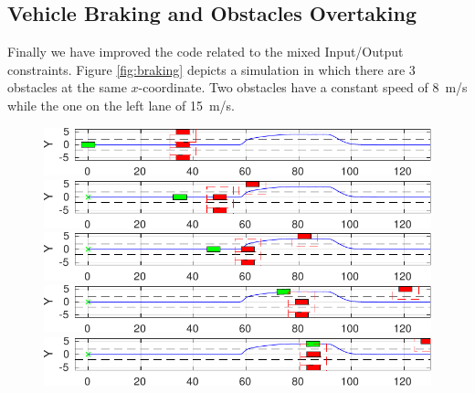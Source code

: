 \subsection{Vehicle Braking and Obstacles Overtaking}
Finally we have improved the code related to the mixed Input/Output constraints. Figure \ref{fig:braking} depicts a simulation in which there are 3 obstacles at the same $x$-coordinate. Two obstacles have a constant speed of \SI{8}{m/s} while the one on the left lane of \SI{15}{m/s}.
\begin{figure}[!h]
	\centering
	\begin{minipage}[t]{\textwidth}
		\includegraphics[width=\textwidth]{./figure/three_obstacles_no_overtaking/braking_0.pdf}
	\end{minipage}
	\begin{minipage}[t]{\textwidth}
		\includegraphics[width=\textwidth]{./figure/three_obstacles_no_overtaking/braking_1.pdf}
	\end{minipage}
	\begin{minipage}[t]{\textwidth}
		\includegraphics[width=\textwidth]{./figure/three_obstacles_no_overtaking/braking_2.pdf}
	\end{minipage}
	\begin{minipage}[t]{\textwidth}
		\includegraphics[width=\textwidth]{./figure/three_obstacles_no_overtaking/braking_3.pdf}
	\end{minipage}
	\begin{minipage}[t]{\textwidth}
		\includegraphics[width=\textwidth]{./figure/three_obstacles_no_overtaking/braking_4.pdf}

\end{minipage}
\end{figure}
